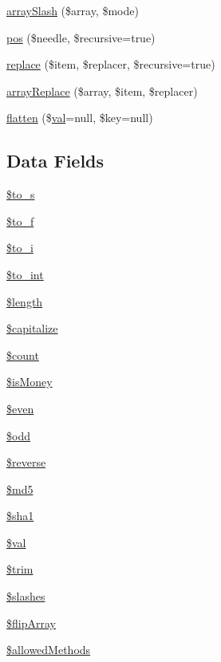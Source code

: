 \begin{DoxyCompactItemize}
\item 
\hyperlink{classr_a61a8836731b261782082897b5fd9a841}{array\-Slash} (\$array, \$mode)
\item 
\hyperlink{classr_a3792ea27c7c50f1509214cbe67bd62e4}{pos} (\$needle, \$recursive=true)
\item 
\hyperlink{classr_a00197520cfed5500d7431e09fa4d58a6}{replace} (\$item, \$replacer, \$recursive=true)
\item 
\hyperlink{classr_a462c50b3bb38143adf421fe36bdc8cc5}{array\-Replace} (\$array, \$item, \$replacer)
\item 
\hyperlink{classr_ae07220d820951c5ab6e43e05e325e552}{flatten} (\$\hyperlink{classr_af745c1e6bc71ed38a120043c0cb13416}{val}=null, \$key=null)
\end{DoxyCompactItemize}
\subsection*{Data Fields}
\begin{DoxyCompactItemize}
\item 
\hyperlink{classr_a5469620d055732b419fff71704232d2f}{\$to\-\_\-s}
\item 
\hyperlink{classr_a85a2ada0b16d9e59f094e77df5848459}{\$to\-\_\-f}
\item 
\hyperlink{classr_afecc47a810cf510aff6387286b9c0e73}{\$to\-\_\-i}
\item 
\hyperlink{classr_a41eb7bfd09e3b6ad118551accfaad638}{\$to\-\_\-int}
\item 
\hyperlink{classr_adf14d8e29912c1855022dfa252aa4087}{\$length}
\item 
\hyperlink{classr_a41c83fecb936997f3e2dae40207e31dd}{\$capitalize}
\item 
\hyperlink{classr_af789423037bbc89dc7c850e761177570}{\$count}
\item 
\hyperlink{classr_aa2f5c87cc7b1ab41965e940d5c1406d9}{\$is\-Money}
\item 
\hyperlink{classr_ab661cd196618c18d23108b83a10728f3}{\$even}
\item 
\hyperlink{classr_aee2d4fa4e98da4e6ad23bee644ab5e7a}{\$odd}
\item 
\hyperlink{classr_ae0d210fd358fa750a11e63b26f6d26ea}{\$reverse}
\item 
\hyperlink{classr_a2557b214f57a046187b88572e443da1f}{\$md5}
\item 
\hyperlink{classr_a310d84f0b735d2ab692b4e2acd90e7ef}{\$sha1}
\item 
\hyperlink{classr_aac81a74a7b30767af29bfd9a695636df}{\$val}
\item 
\hyperlink{classr_a0ca8b395aaa07c4aac3bdb1f9964d4f5}{\$trim}
\item 
\hyperlink{classr_ac95fd27a35f2d9674ef3760a4ea1d07f}{\$slashes}
\item 
\hyperlink{classr_a530c822a487ad325618509d8bf48553a}{\$flip\-Array}
\item 
\hyperlink{classr_ab278eba7cab5341dacdccecd7a2cc2df}{\$allowed\-Methods}
\end{DoxyCompactItemize}


